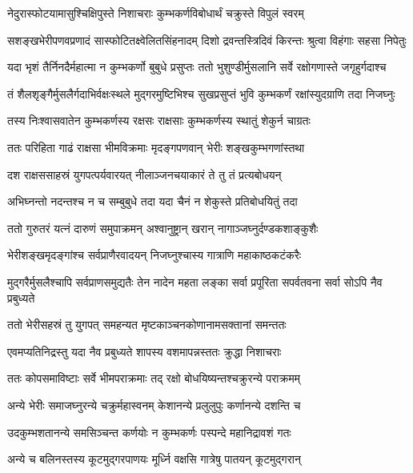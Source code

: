 \twolineshloka
{नेदुरास्फोटयामासुश्चिक्षिपुस्ते निशाचराः}
{कुम्भकर्णविबोधार्थं चक्रुस्ते विपुलं स्वरम्} %

\twolineshloka
{सशङ्खभेरीपणवप्रणादं सास्फोटितक्ष्वेलितसिंहनादम्}
{दिशो द्रवन्तस्त्रिदिवं किरन्तः श्रुत्वा विहंगाः सहसा निपेतुः} %

\twolineshloka
{यदा भृशं तैर्निनदैर्महात्मा न कुम्भकर्णो बुबुधे प्रसुप्तः}
{ततो भुशुण्डीर्मुसलानि सर्वे रक्षोगणास्ते जगृहुर्गदाश्च} %

\twolineshloka
{तं शैलशृङ्गैर्मुसलैर्गदाभिर्वक्षःस्थले मुद्गरमुष्टिभिश्च}
{सुखप्रसुप्तं भुवि कुम्भकर्णं रक्षांस्युदग्राणि तदा निजघ्नुः} %

\twolineshloka
{तस्य निःश्वासवातेन कुम्भकर्णस्य रक्षसः}
{राक्षसाः कुम्भकर्णस्य स्थातुं शेकुर्न चाग्रतः} %

\twolineshloka
{ततः परिहिता गाढं राक्षसा भीमविक्रमाः}
{मृदङ्गपणवान् भेरीः शङ्खकुम्भगणांस्तथा} %

\twolineshloka
{दश राक्षससाहस्रं युगपत्पर्यवारयत्}
{नीलाञ्जनचयाकारं ते तु तं प्रत्यबोधयन्} %

\twolineshloka
{अभिघ्नन्तो नदन्तश्च न च सम्बुबुधे तदा}
{यदा चैनं न शेकुस्ते प्रतिबोधयितुं तदा} %

\twolineshloka
{ततो गुरुतरं यत्नं दारुणं समुपाक्रमन्}
{अश्वानुष्ट्रान् खरान् नागाञ्जघ्नुर्दण्डकशाङ्कुशैः} %

\twolineshloka
{भेरीशङ्खमृदङ्गांश्च सर्वप्राणैरवादयन्}
{निजघ्नुश्चास्य गात्राणि महाकाष्ठकटंकरैः} %

\threelineshloka
{मुद्गरैर्मुसलैश्चापि सर्वप्राणसमुद्यतैः}
{तेन नादेन महता लङ्का सर्वा प्रपूरिता}
{सपर्वतवना सर्वा सोऽपि नैव प्रबुध्यते} %

\twolineshloka
{ततो भेरीसहस्रं तु युगपत् समहन्यत}
{मृष्टकाञ्चनकोणानामसक्तानां समन्ततः} %

\twolineshloka
{एवमप्यतिनिद्रस्तु यदा नैव प्रबुध्यते}
{शापस्य वशमापन्नस्ततः क्रुद्धा निशाचराः} %

\twolineshloka
{ततः कोपसमाविष्टाः सर्वे भीमपराक्रमाः}
{तद् रक्षो बोधयिष्यन्तश्चक्रुरन्ये पराक्रमम्} %

\twolineshloka
{अन्ये भेरीः समाजघ्नुरन्ये चक्रुर्महास्वनम्}
{केशानन्ये प्रलुलुपुः कर्णानन्ये दशन्ति च} %

\twolineshloka
{उदकुम्भशतानन्ये समसिञ्चन्त कर्णयोः}
{न कुम्भकर्णः पस्पन्दे महानिद्रावशं गतः} %

\twolineshloka
{अन्ये च बलिनस्तस्य कूटमुद्गरपाणयः}
{मूर्ध्नि वक्षसि गात्रेषु पातयन् कूटमुद्गरान्} %

